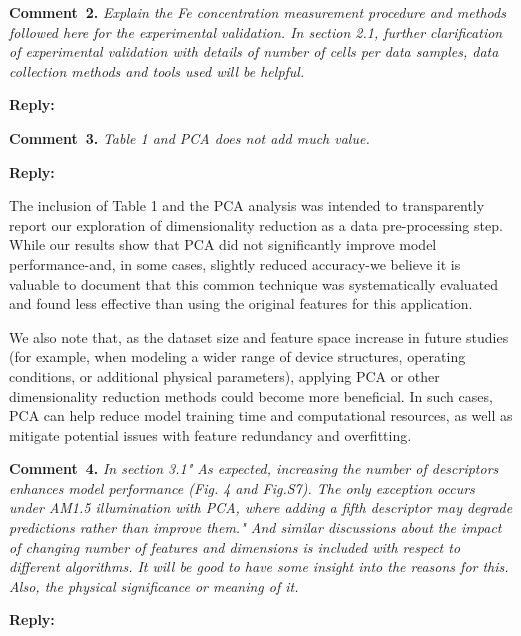 \documentclass[a4paper,fleqn]{cas-sc}
\begin{document}
\vspace{1cm}
\noindent
\textcolor[rgb]{0.00,0.50,1.00}{\textbf{Comment~2.}}
\emph{Explain the Fe concentration measurement procedure and methods followed here for the experimental validation. In section 2.1, further clarification of experimental validation with details of number of cells per data samples, data collection methods and tools used will be helpful.}

\noindent
\textcolor[rgb]{0.51,0.00,0.00}{\textbf{Reply:}}


\vspace{1cm}
\noindent
\textcolor[rgb]{0.00,0.50,1.00}{\textbf{Comment~3.}}
\emph{Table 1 and PCA does not add much value.}

\noindent
\textcolor[rgb]{0.51,0.00,0.00}{\textbf{Reply:}}


The inclusion of Table 1 and the PCA analysis was intended to transparently report our exploration of dimensionality reduction as a data pre-processing step.
While our results show that PCA did not significantly improve model performance-and, in some cases, slightly reduced accuracy-we believe it is valuable to document that this common technique was systematically evaluated and found less effective than using the original features for this application.


We also note that, as the dataset size and feature space increase in future studies (for example, when modeling a wider range of device structures, operating conditions, or additional physical parameters), applying PCA or other dimensionality reduction methods could become more beneficial.
In such cases, PCA can help reduce model training time and computational resources, as well as mitigate potential issues with feature redundancy and overfitting.

\vspace{1cm}
\noindent
\textcolor[rgb]{0.00,0.50,1.00}{\textbf{Comment~4.}}
\emph{In section 3.1" As expected, increasing the number of descriptors enhances model performance (Fig. 4 and Fig.S7). The only exception occurs under AM1.5 illumination with PCA, where adding a fifth descriptor may degrade predictions rather than improve them." And similar discussions about the impact of changing number of features and dimensions is included with respect to different algorithms.  It will be good to have some insight into the reasons for this. Also, the physical significance or meaning of it.}

\noindent
\textcolor[rgb]{0.51,0.00,0.00}{\textbf{Reply:}}
\end{document}
